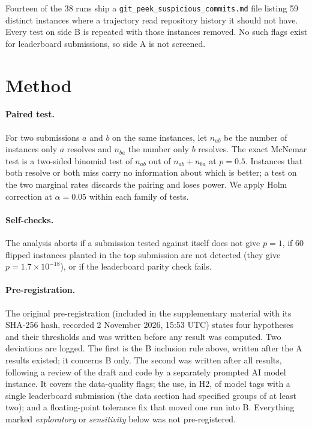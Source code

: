 \documentclass[10pt]{article}
\begin{document}
Fourteen of the 38 runs ship a \texttt{git\_peek\_suspicious\_commits.md} file listing 59 distinct instances where a trajectory read repository history it should not have. Every test on side B is repeated with those instances removed. No such flags exist for leaderboard submissions, so side A is not screened.

\section{Method}
\label{sec:method}

\paragraph{Paired test.} For two submissions $a$ and $b$ on the same instances, let $n_{ab}$ be the number of instances only $a$ resolves and $n_{ba}$ the number only $b$ resolves. The exact McNemar test \citep{mcnemar1947} is a two-sided binomial test of $n_{ab}$ out of $n_{ab}+n_{ba}$ at $p=0.5$. Instances that both resolve or both miss carry no information about which is better; a test on the two marginal rates discards the pairing and loses power. We apply Holm correction \citep{holm1979} at $\alpha=0.05$ within each family of tests.

\paragraph{Self-checks.} The analysis aborts if a submission tested against itself does not give $p=1$, if 60 flipped instances planted in the top submission are not detected (they give $p=1.7\times10^{-18}$), or if the leaderboard parity check fails.

\paragraph{Pre-registration.} The original pre-registration (included in the supplementary material with its SHA-256 hash, recorded 2 November 2026, 15:53 UTC) states four hypotheses and their thresholds and was written before any result was computed. Two deviations are logged. The first is the B inclusion rule above, written after the A results existed; it concerns B only. The second was written after all results, following a review of the draft and code by a separately prompted AI model instance. It covers the data-quality flags; the use, in H2, of model tags with a single leaderboard submission (the data section had specified groups of at least two); and a floating-point tolerance fix that moved one run into B. Everything marked \emph{exploratory} or \emph{sensitivity} below was not pre-registered.
\end{document}
